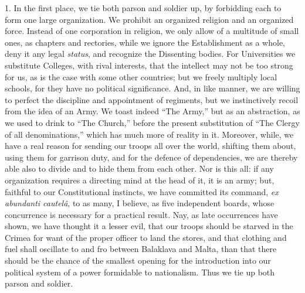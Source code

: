1. In the first place, we tie both parson and
soldier up, by forbidding each to form one large organization. We
prohibit an organized religion and an organized force. Instead of one
corporation in religion, we only allow of a multitude of small ones,
as chapters and rectories, while we ignore the Establishment as a
whole, deny it any legal \emph{status}, and recognize the Dissenting
bodies. For Universities we substitute Colleges, with rival interests,
that the intellect may not be too strong for us, as is the case with
some other countries; but we freely multiply local schools, for they
have no political significance. And, in like manner, we are willing to
perfect the discipline and appointment of regiments, but we
instinctively recoil from the idea of an Army. We toast indeed ``The
Army,'' but as an abstraction, as we used to drink to ``The
Church,'' before the present substitution of ``The Clergy of all
denominations,'' which has much more of reality in it. Moreover, while,
we have a real reason for sending our troops all over the world,
shifting them about, using them for garrison duty, and for the defence
of dependencies, we are thereby able also to divide and to hide them
from each other. Nor is this all: if any organization requires a
directing mind at the head of it, it is an army; but, faithful to our
Constitutional instincts, we have committed its command, \emph{ex
abundanti cautelâ}, to as many, I believe, as five independent
boards, whose concurrence is necessary for a practical result. Nay, as
late occurrences have shown, we have thought it a lesser evil, that
our troops should be starved in the Crimea for want of the proper
officer to land the stores, and that clothing and fuel shall oscillate
to and fro between Balaklava and Malta, than that there should be the
chance of the smallest opening for the introduction into our political
system of a power formidable to nationalism. Thus we tie up both
parson and soldier.

